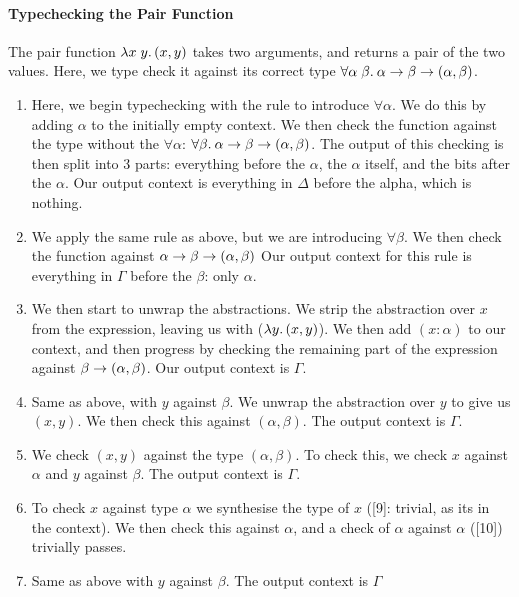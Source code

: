\paragraph{Typechecking the Pair Function}
The pair function $\lambda x\;y.\, (x, y)$ takes two arguments, and returns a pair of the two values. Here, we type check it against its correct type $\forall\alpha\;\beta.\:{\alpha \rightarrow \beta \rightarrow (\alpha, \beta)}$. 

\begin{enumerate}
    \item Here, we begin typechecking with the \AllIntro rule to introduce $\forall \alpha$. We do this by adding $\alpha$ to the initially empty context. We then check the function against the type without the $\forall \alpha$: $\forall\beta.\:{\alpha \rightarrow \beta \rightarrow (\alpha, \beta)}$. The output of this checking is then split into 3 parts: everything before the $\alpha$, the $\alpha$ itself, and the bits after the $\alpha$. Our output context is everything in $\Delta$ before the alpha, which is nothing. 
    \item We apply the same rule as above, but we are introducing $\forall \beta$. We then check the function against ${\alpha \rightarrow \beta \rightarrow (\alpha, \beta)}$
    Our output context for this rule is everything in $\Gamma$ before the $\beta$: only $\alpha$.
    \item We then start to unwrap the abstractions. We strip the abstraction over $x$ from the expression, leaving us with ($\lambda y.\, (x, y)$). We then add $(x:\alpha)$ to our context, and then progress by checking the remaining part of the expression against ${\beta \rightarrow (\alpha, \beta)}$. Our output context is $\Gamma$. 
    \item Same as above, with $y$ against $\beta$. We unwrap the abstraction over $y$ to give us $(x, y)$. We then check this against ${(\alpha, \beta)}$. The output context is $\Gamma$.
    \item We check $(x, y)$ against the type $(\alpha, \beta)$. To check this, we check $x$ against $\alpha$ and $y$ against $\beta$. The output context is $\Gamma$.
    \item To check $x$ against type $\alpha$ we synthesise the type of $x$ ([9]: trivial, as its in the context). We then check this against $\alpha$, and a check of $\alpha$ against $\alpha$ ([10]) trivially passes.
    \item Same as above with $y$ against $\beta$. The output context is $\Gamma$
\end{enumerate}



